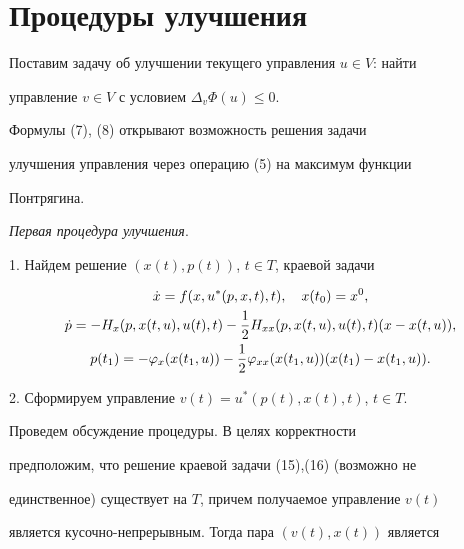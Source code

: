 \section{Процедуры улучшения}





Поставим задачу об улучшении текущего управления $u\in V$: найти 


управление $v\in V$ с условием $\Delta_v\Phi(u)\le0$.


Формулы (7), (8) открывают возможность решения задачи 


улучшения управления через операцию (5) на максимум функции 


Понтрягина.


\medskip





{\it Первая процедура улучшения}.


1. Найдем решение $(x(t),p(t))$, $t\in T$, краевой задачи


\begin{gather}


\Dot x=f(x,u^*(p,x,t),t),\quad x(t_0)=x^0,\\


%


\Dot p=-H_x(p,x(t,u),u(t),t)-\frac{1}{2}H_{xx}


(p,x(t,u),u(t),t)(x-x(t,u)),\notag \\


%


p(t_1)=-\varphi_x(x(t_1,u))-\frac{1}{2}\varphi_{xx}


(x(t_1,u))(x(t_1)-x(t_1,u)).


\end{gather}





2. Сформируем управление $v(t)=u^*(p(t),x(t),t)$, $t\in T$.


\medskip





Проведем обсуждение процедуры. В целях корректности 


предположим, что решение краевой задачи (15),(16) (возможно не 


единственное) существует на $T$, причем получаемое управление $v(t)$


является кусочно-непрерывным. Тогда пара $(v(t),x(t))$ является 


